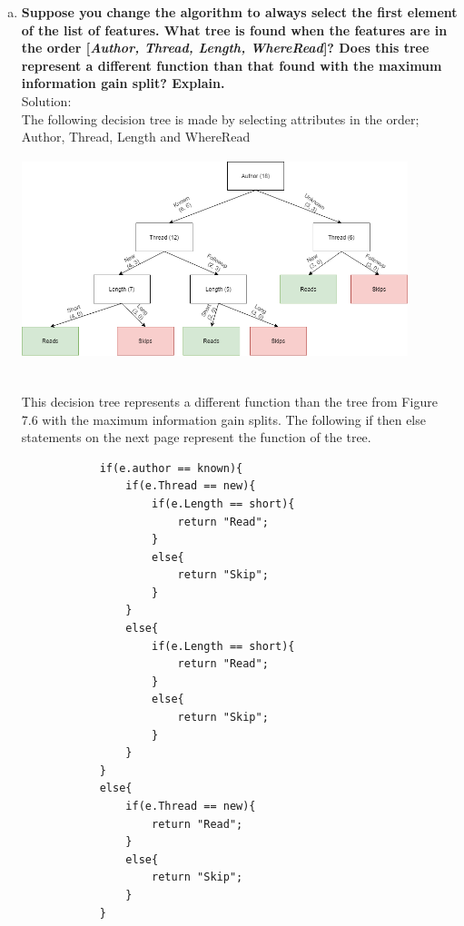 \documentclass{article}
\begin{document}
\begin{enumerate}[(a)]
    \item \textbf{Suppose you change the algorithm to always select the first element of the list of features. What tree is found when the features are in the order [\emph{Author, Thread, Length, WhereRead}]? Does this tree represent a different function than that found with the maximum information gain split? Explain.}\\Solution:\\
    The following decision tree is made by selecting attributes in the order; Author, Thread, Length and WhereRead
    \begin{center}
\hspace*{-2cm} \includegraphics[width=425px,height=220px]{tree1.png}
    \end{center}\\
    This decision tree represents a different function than the tree from Figure 7.6 with the maximum information gain splits. The following if then else statements on the next page represent the function of the tree.\\ 
    \newpage
        \begin{lstlisting}
            if(e.author == known){
                if(e.Thread == new){
                    if(e.Length == short){
                        return "Read";
                    }
                    else{
                        return "Skip";
                    }
                }
                else{
                    if(e.Length == short){
                        return "Read";
                    }
                    else{
                        return "Skip";
                    }
                }
            }
            else{
                if(e.Thread == new){
                    return "Read";
                }
                else{
                    return "Skip";
                }
            }
        \end{lstlisting}

\end{enumerate}
\end{document}
